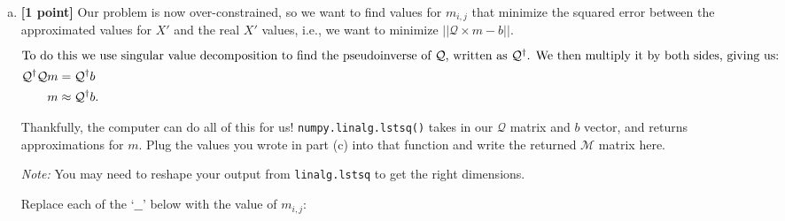 \begin{enumerate}[(a)]
\begin{tcolorbox}[colback=white!5!white,colframe=green!75!black]
{{    %
    }}
\end{tcolorbox}

\pagebreak
\item \textbf{[1 point]} Our problem is now over-constrained, so we want to find values for $m_{i,j}$ that minimize the squared error between the approximated values for $X'$ and the real $X'$ values, i.e., we want to minimize $||\mathcal{Q} \times m - b||$. 
\begin{align*}
\intertext{To do this we use singular value decomposition to find the pseudoinverse of $\mathcal{Q}$, written as $\mathcal{Q}^\dagger$. We then multiply it by both sides, giving us:}
 \mathcal{Q}^\dagger \mathcal{Q}m &= \mathcal{Q}^\dagger b\\
 \quad m &\approx \mathcal{Q}^\dagger b.
\end{align*}

Thankfully, the computer can do all of this for us! \texttt{numpy.linalg.lstsq()} takes in our $\mathcal{Q}$ matrix and $b$ vector, and returns approximations for $m$. Plug the values you wrote in part (c) into that function and write the returned $\mathcal{M}$ matrix here.

\textit{Note:} You may need to reshape your output from \texttt{linalg.lstsq} to get the right dimensions.

\begin{tcolorbox}[colback=orange!5!white,colframe=orange!75!black]
Replace each of the `$\_\_$' below with the value of $m_{i, j}$:
\end{tcolorbox}


\end{enumerate}



